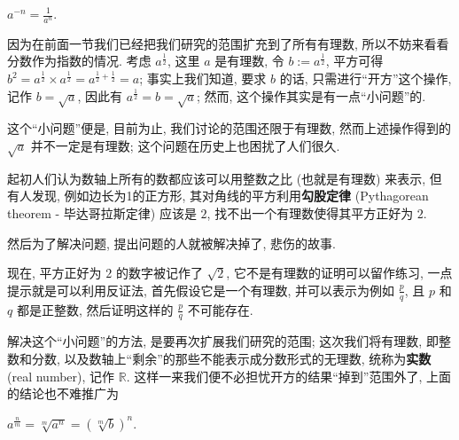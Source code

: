 \begin{tcolorbox}[size=fbox, breakable, enhanced jigsaw, title={幂运算
(exponentiation)}]
\begin{itemize}

{\item
  $\boxed{a^{-n}=\frac{1}{a^n}}$.}
\end{itemize}

因为在前面一节我们已经把我们研究的范围扩充到了所有有理数,
所以不妨来看看分数作为指数的情况. 考虑 $a^{\frac{1}{2}}$, 这里 $a$
是有理数, 令 $b:=a^{\frac{1}{2}}$, 平方可得
$b^2=a^{\frac{1}{2}}\times a^{\frac{1}{2}}=a^{\frac{1}{2}+\frac{1}{2}}=a$;
事实上我们知道, 要求 $b$ 的话, 只需进行``开方''这个操作, 记作
$b=\sqrt{a}$, 因此有 $a^{\frac{1}{2}}=b=\sqrt{a}$; 然而,
这个操作其实是有一点``小问题''的.

\begin{newquote}
这个``小问题''便是, 目前为止, 我们讨论的范围还限于有理数,
然而上述操作得到的 $\sqrt{a}$ 并不一定是有理数;
这个问题在历史上也困扰了人们很久.

起初人们认为数轴上所有的数都应该可以用整数之比 (也就是有理数) 来表示,
但有人发现, 例如边长为1的正方形, 其对角线的平方利用\textbf{勾股定律}
(Pythagorean theorem - 毕达哥拉斯定律) 应该是 $2$,
找不出一个有理数使得其平方正好为 $2$.

然后为了解决问题, 提出问题的人就被解决掉了, 悲伤的故事.

现在, 平方正好为 $2$ 的数字被记作了 $\sqrt{2}$,
它不是有理数的证明可以留作练习, 一点提示就是可以利用反证法,
首先假设它是一个有理数, 并可以表示为例如 $\frac{p}{q}$, 且 $p$ 和
$q$ 都是正整数, 然后证明这样的 $\frac{p}{q}$ 不可能存在.
\end{newquote}

解决这个``小问题''的方法, 是要再次扩展我们研究的范围; 这次我们将有理数,
即整数和分数, 以及数轴上``剩余''的那些不能表示成分数形式的无理数,
统称为\textbf{实数} (real number), 记作 $\mathbb{R}$.
这样一来我们便不必担忧开方的结果``掉到''范围外了, 上面的结论也不难推广为

\begin{itemize}

{\item
  $\boxed{a^{\frac{n}{m}}=\sqrt[m]{a^n}=(\sqrt[m]{b})^n}$.}
\end{itemize}

\end{tcolorbox}

